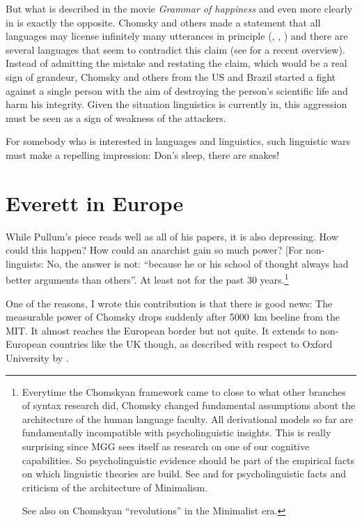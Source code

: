 \documentclass[output=paper,colorlinks,citecolor=brown]{langscibook}
\begin{document}
But what is described in the movie \emph{Grammar of happiness}  and even more clearly
in  is exactly the opposite. Chomsky and others made a statement that all languages may license infinitely
many utterances in principle (\citealt*[]{HCF2002a}, \citealt[]{EH2005a-u}, \citealt*[]{HNG2005a}) and there are several languages that seem to contradict this claim (see
 for a recent overview). Instead of
admitting the mistake and restating the claim, which would be a real sign of grandeur, Chomsky and
others from the US and Brazil started a fight against a single person with the aim of destroying the
person's scientific life and harm his integrity. Given the situation linguistics is currently in,
this aggression must be seen as a sign of weakness of the attackers.

For somebody who is interested in languages and linguistics, such linguistic wars \citep{Harris93a} must make a
repelling impression: Don's sleep, there are snakes!    

\section{Everett in Europe}

While Pullum's piece reads well as all of his papers, it is also depressing. How could this happen?
How could an anarchist gain so much power? [For non-linguists: No, the answer is not: ``because he or
his school of thought always had better arguments than others''. At least not for the past 30
years.\footnote{
Everytime the Chomskyan framework came to close to what other branches of syntax research did,
Chomsky changed fundamental assumptions about the architecture of the human language faculty. All
derivational models so far are fundamentally incompatible with psycholinguistic insights. This is really
surprising since MGG sees itself as research on one of our cognitive capabilities. So
psycholinguistic evidence should be part of the empirical facts on which linguistic theories are
build. See  and \citet{BM2021a} for psycholinguistic facts and criticism of the
architecture of Minimalism.

See also  on Chomskyan ``revolutions'' in the Minimalist era.
}

One of the reasons, I wrote this contribution is that
there is good news: The measurable power of Chomsky drops suddenly after 5000~km beeline from the
MIT. It almost reaches the European border but not quite. It extends to non-European countries like
the UK though, as described with respect to Oxford University by . 
\end{document}

